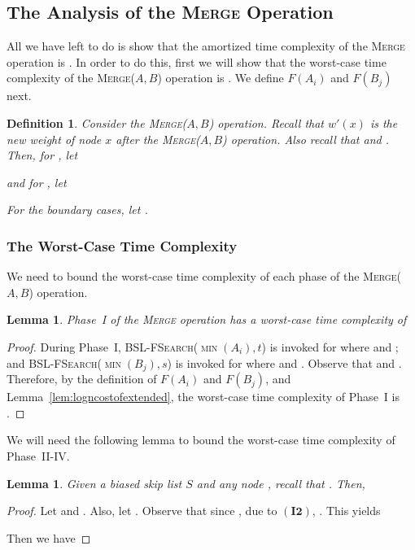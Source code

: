 \documentclass[11pt]{article}
\newcommand{\kwUnion}{Merge}
\newcommand{\Union}{\mbox{\textsc{\kwUnion{}}}}
\newcommand{\Unionx}[2]{\mbox{\textsc{\kwUnion(\ensuremath{#1,#2})}}}
\newcommand{\Bslfsrcx}[2]{\mbox{\textsc{BSL-FSearch(\ensuremath{#1,#2})}}}
\newcommand{\invtwo}{\ensuremath{\mathbf{(I2)}}}
\newcommand{\intmin}[1]{\ensuremath{\min(\intl #1)}}
\newcommand{\intl}[1]{\ensuremath{#1}}
\newcommand{\nodenewweight}[1]{{\ensuremath{w'(\node #1)}}}
\newcommand{\node}[1]{\ensuremath{#1}}
\newcommand{\intfun}[1]{\ensuremath{F(\intl #1)}}
\newcommand{\bsl}[1]{\ensuremath{#1}}
\newcounter{count}
\newtheorem{lemma}[count]{Lemma}
\newtheorem{defn}[count]{Definition}
\begin{document}
\subsection{The Analysis of the \Union{} Operation} 
\label{subsec:AnalysisUnion} 
All we have left to do is show that the amortized time complexity of the \Union{} operation is .  In order to do this, first we will show that the worst-case time complexity of the \Unionx{A}{B} operation is . We define \intfun{A_i} and \intfun{B_j} next. 

\begin{defn} 
Consider the \Unionx{A}{B} operation. 
Recall that \nodenewweight{x} is the new weight of node \node x after the \Unionx{A}{B} operation. Also recall that  and . 
Then, for , let 
 
and for , let 
 
For the boundary cases, let . 
\end{defn} 


\subsubsection{The Worst-Case Time Complexity} 
\label{subsubsec:AnalysisUnionWorst} 


We need to bound the worst-case time complexity of each phase of the \Unionx{A}{B} operation. 


\begin{lemma} 
\label{lem:phaseone} 
Phase~I of the \Union{} operation has a worst-case time complexity of  
\end{lemma} 

\begin{proof} 
During Phase~I, \Bslfsrcx{\intmin{A_i}}{t} is invoked for  where  and ;  and \Bslfsrcx{\intmin{B_j}}{s} is invoked for  where  and . Observe that  and . Therefore, by the definition of \intfun{A_i} and \intfun{B_j}, and Lemma~\ref{lem:logncostofextended}, the worst-case time complexity of Phase~I is . 
\end{proof} 

We will need the following lemma to bound the worst-case time complexity of Phase~II-IV. 

\begin{lemma} 
\label{lem:height} 
Given a biased skip list \bsl S and any node , recall that . Then, 
 
\end{lemma} 

\begin{proof} 
Let  and . Also, let . 
Observe that since , due to \invtwo{}, .
This yields

Then we have 
 
\end{proof} 
\end{document}
